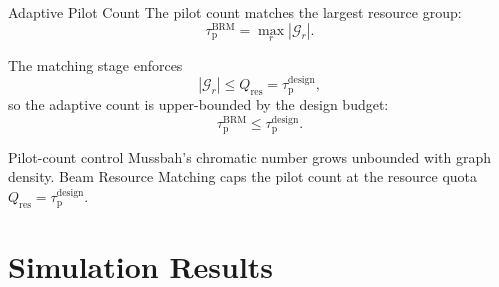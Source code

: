 \documentclass[10pt,aspectratio=169]{beamer}
\newcommand{\taup}{\tau_{\mathrm{p}}}
\newcommand{\taudesign}{\tau_{\mathrm{p}}^{\mathrm{design}}}
\newcommand{\BRM}{Beam Resource Matching}
\begin{document}
\begin{frame}{Adaptive Pilot Count}
    \small
    The pilot count matches the largest resource group:
    \[
        \taup^{\mathrm{BRM}}
        =
        \max_{r}|\mathcal{G}_r|.
    \]
    
    The matching stage enforces
    \[
        |\mathcal{G}_r| \le Q_{\mathrm{res}}=\taudesign,
    \]
    so the adaptive count is upper-bounded by the design budget:
    \[
        \taup^{\mathrm{BRM}}\le \taudesign.
    \]
    
    \vspace{0.5em}
    \begin{block}{Pilot-count control}
        Mussbah's chromatic number grows unbounded with graph density. \BRM{} caps the pilot count at the resource quota \(Q_{\mathrm{res}}=\taudesign\).
    \end{block}
\end{frame}

\section{Simulation Results}
\end{document}
